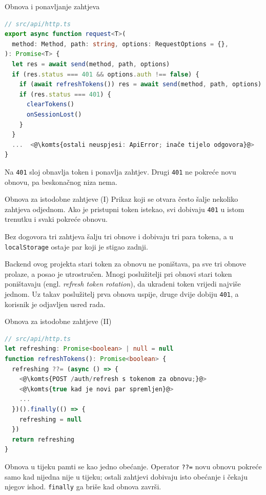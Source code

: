 \begin{frame}[fragile]{Obnova i ponavljanje zahtjeva}
\begin{lstlisting}[language=typescript]
// src/api/http.ts
export async function request<T>(
  method: Method, path: string, options: RequestOptions = {},
): Promise<T> {
  let res = await send(method, path, options)
  if (res.status === 401 && options.auth !== false) {
    if (await refreshTokens()) res = await send(method, path, options)
    if (res.status === 401) {
      clearTokens()
      onSessionLost()
    }
  }
  ...  <@\komts{ostali neuspjesi: ApiError; inače tijelo odgovora}@>
}
\end{lstlisting}

\vspace{0.1em}
Na \texttt{401} sloj obnavlja token i ponavlja zahtjev. Drugi \texttt{401} ne pokreće novu obnovu, pa beskonačnog niza nema.
\end{frame}

\begin{frame}{Obnova za istodobne zahtjeve (I)}
Prikaz koji se otvara često šalje nekoliko zahtjeva odjednom. Ako je pristupni token istekao, svi dobivaju \texttt{401} u istom trenutku i svaki pokreće obnovu.

\pause
\vspace{0.9em}
Bez dogovora tri zahtjeva šalju tri obnove i dobivaju tri para tokena, a u \texttt{localStorage} ostaje par koji je stigao zadnji.

\vspace{0.9em}
Backend ovog projekta stari token za obnovu ne poništava, pa sve tri obnove prolaze, a posao je utrostručen. Mnogi poslužitelji pri obnovi stari token poništavaju (engl. \emph{refresh token rotation}), da ukradeni token vrijedi najviše jednom. Uz takav poslužitelj prva obnova uspije, druge dvije dobiju \texttt{401}, a korisnik je odjavljen usred rada.
\end{frame}

\begin{frame}[fragile]{Obnova za istodobne zahtjeve (II)}
\begin{lstlisting}[language=typescript]
// src/api/http.ts
let refreshing: Promise<boolean> | null = null
function refreshTokens(): Promise<boolean> {
  refreshing ??= (async () => {
    <@\komts{POST /auth/refresh s tokenom za obnovu;}@>
    <@\komts{true kad je novi par spremljen}@>
    ...
  })().finally(() => {
    refreshing = null
  })
  return refreshing
}
\end{lstlisting}

\vspace{0.3em}
Obnova u tijeku pamti se kao jedno obećanje. Operator \texttt{??=} novu obnovu pokreće samo kad nijedna nije u tijeku; ostali zahtjevi dobivaju isto obećanje i čekaju njegov ishod. \texttt{finally} ga briše kad obnova završi.
\end{frame}

